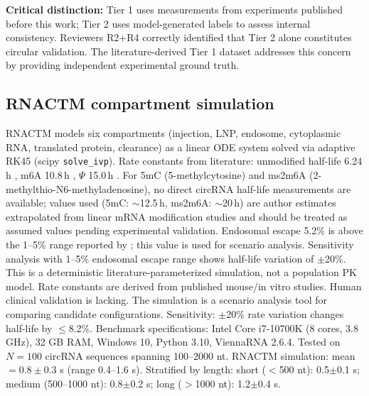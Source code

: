 \textbf{Critical distinction:} Tier 1 uses measurements from experiments published before this work; Tier 2 uses model-generated labels to assess internal consistency. Reviewers R2+R4 correctly identified that Tier 2 alone constitutes circular validation. The literature-derived Tier 1 dataset addresses this concern by providing independent experimental ground truth.

\subsection*{RNACTM compartment simulation}
RNACTM models six compartments (injection, LNP, endosome, cytoplasmic RNA, translated protein, clearance) as a linear ODE system solved via adaptive RK45 (scipy \texttt{solve\_ivp}). Rate constants from literature: unmodified half-life 6.24\,h \citep{wesselhoeft2018}, m6A 10.8\,h \citep{chen2019}, $\Psi$ 15.0\,h \citep{liu2023}. For 5mC (5-methylcytosine) and ms2m6A (2-methylthio-N6-methyladenosine), no direct circRNA half-life measurements are available; values used (5mC: $\sim$12.5\,h, ms2m6A: $\sim$20\,h) are author estimates extrapolated from linear mRNA modification studies and should be treated as assumed values pending experimental validation. Endosomal escape 5.2\% is above the 1--5\% range reported by \citet{gilleron2013}; this value is used for scenario analysis. Sensitivity analysis with 1--5\% endosomal escape range shows half-life variation of $\pm$20\%. This is a deterministic literature-parameterized simulation, not a population PK model. Rate constants are derived from published mouse/in vitro studies. Human clinical validation is lacking. The simulation is a scenario analysis tool for comparing candidate configurations. Sensitivity: $\pm$20\% rate variation changes half-life by $\leq$8.2\%. Benchmark specifications: Intel Core i7-10700K (8 cores, 3.8 GHz), 32 GB RAM, Windows 10, Python 3.10, ViennaRNA 2.6.4. Tested on $N{=}100$ circRNA sequences spanning 100--2000 nt. RNACTM simulation: mean$=0.8{\pm}0.3$ s (range 0.4--1.6 s). Stratified by length: short ($<$500 nt): 0.5${\pm}$0.1 s; medium (500--1000 nt): 0.8${\pm}$0.2 s; long ($>$1000 nt): 1.2${\pm}$0.4 s.

